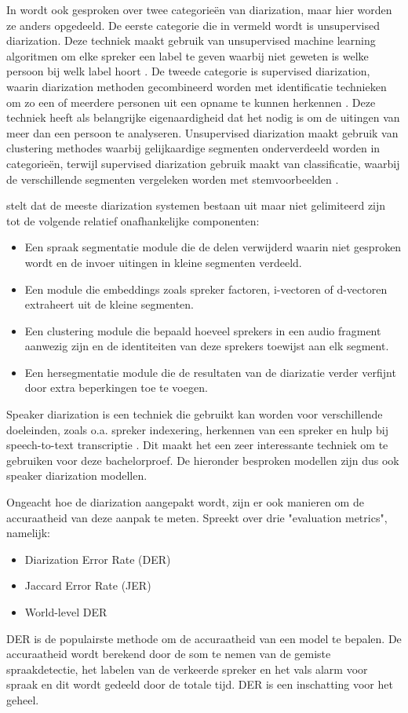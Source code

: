 In \textcite{Khoma2023} wordt ook gesproken over twee categorieën van diarization, maar hier worden ze anders opgedeeld. De eerste categorie die in \textcite{Khoma2023} vermeld wordt is unsupervised diarization. Deze techniek maakt gebruik van unsupervised machine learning algoritmen om elke spreker een label te geven waarbij niet geweten is welke persoon bij welk label hoort \autocite{Khoma2023}. De tweede categorie is supervised diarization, waarin diarization methoden gecombineerd worden met identificatie technieken om zo een of meerdere personen uit een opname te kunnen herkennen \autocite{Khoma2023}. Deze techniek heeft als belangrijke eigenaardigheid dat het nodig is om de uitingen van meer dan een persoon te analyseren\autocite{Khoma2023}. Unsupervised diarization maakt gebruik van clustering methodes waarbij gelijkaardige segmenten onderverdeeld worden in categorieën, terwijl supervised diarization gebruik maakt van classificatie, waarbij de verschillende segmenten vergeleken worden met stemvoorbeelden \autocite{Khoma2023}.

\textcite{Zhang2018} stelt dat de meeste diarization systemen bestaan uit maar niet gelimiteerd zijn tot de volgende relatief onafhankelijke componenten:
\begin{itemize}
	\item Een spraak segmentatie module die de delen verwijderd waarin niet gesproken wordt en de invoer uitingen in kleine segmenten verdeeld.
	\item Een module die embeddings zoals spreker factoren, i-vectoren of d-vectoren extraheert uit de kleine segmenten.
	\item Een clustering module die bepaald hoeveel sprekers in een audio fragment aanwezig zijn en de identiteiten van deze sprekers toewijst aan elk segment.
	\item Een hersegmentatie module die de resultaten van de diarizatie verder verfijnt door extra beperkingen toe te voegen.
\end{itemize}

Speaker diarization is een techniek die gebruikt kan worden voor verschillende doeleinden, zoals o.a. spreker indexering, herkennen van een spreker en hulp bij speech-to-text transcriptie \autocite{AngueraMiro2012}. Dit maakt het een zeer interessante techniek om te gebruiken voor deze bachelorproef. De hieronder besproken modellen zijn dus ook speaker diarization modellen.

Ongeacht hoe de diarization aangepakt wordt, zijn er ook manieren om de accuraatheid van deze aanpak te meten.  \textcite{Park2021} Spreekt over drie "evaluation metrics", namelijk:
\begin{itemize}
	\item Diarization Error Rate (DER)
	\item Jaccard Error Rate (JER)
	\item World-level DER
\end{itemize}
DER is de populairste methode om de accuraatheid van een model te bepalen. De accuraatheid wordt berekend door de som te nemen van de gemiste spraakdetectie, het labelen van de verkeerde spreker en het vals alarm voor spraak en dit wordt gedeeld door de totale tijd. DER is een inschatting voor het geheel. \autocite{Park2021}

